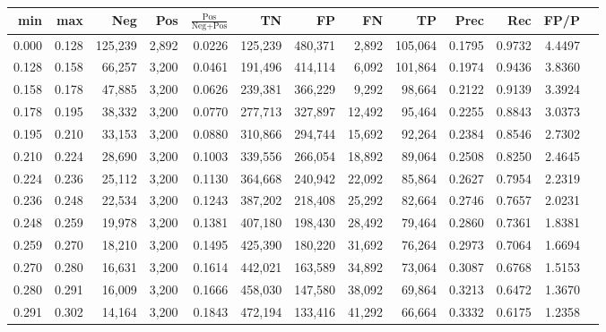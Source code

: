 \begin{tabular}{rrrrrrrrrrrrr}
\toprule
  min &   max &     Neg &   Pos & $\frac{\text{Pos}}{\text{Neg}+\text{Pos}}$ &      TN &      FP &      FN &      TP &   Prec &    Rec &   FP/P \\
\midrule
0.000 & 0.128 & 125,239 & 2,892 &                                     0.0226 & 125,239 & 480,371 &   2,892 & 105,064 & 0.1795 & 0.9732 & 4.4497 \\
0.128 & 0.158 &  66,257 & 3,200 &                                     0.0461 & 191,496 & 414,114 &   6,092 & 101,864 & 0.1974 & 0.9436 & 3.8360 \\
0.158 & 0.178 &  47,885 & 3,200 &                                     0.0626 & 239,381 & 366,229 &   9,292 &  98,664 & 0.2122 & 0.9139 & 3.3924 \\
0.178 & 0.195 &  38,332 & 3,200 &                                     0.0770 & 277,713 & 327,897 &  12,492 &  95,464 & 0.2255 & 0.8843 & 3.0373 \\
0.195 & 0.210 &  33,153 & 3,200 &                                     0.0880 & 310,866 & 294,744 &  15,692 &  92,264 & 0.2384 & 0.8546 & 2.7302 \\
0.210 & 0.224 &  28,690 & 3,200 &                                     0.1003 & 339,556 & 266,054 &  18,892 &  89,064 & 0.2508 & 0.8250 & 2.4645 \\
0.224 & 0.236 &  25,112 & 3,200 &                                     0.1130 & 364,668 & 240,942 &  22,092 &  85,864 & 0.2627 & 0.7954 & 2.2319 \\
0.236 & 0.248 &  22,534 & 3,200 &                                     0.1243 & 387,202 & 218,408 &  25,292 &  82,664 & 0.2746 & 0.7657 & 2.0231 \\
0.248 & 0.259 &  19,978 & 3,200 &                                     0.1381 & 407,180 & 198,430 &  28,492 &  79,464 & 0.2860 & 0.7361 & 1.8381 \\
0.259 & 0.270 &  18,210 & 3,200 &                                     0.1495 & 425,390 & 180,220 &  31,692 &  76,264 & 0.2973 & 0.7064 & 1.6694 \\
0.270 & 0.280 &  16,631 & 3,200 &                                     0.1614 & 442,021 & 163,589 &  34,892 &  73,064 & 0.3087 & 0.6768 & 1.5153 \\
0.280 & 0.291 &  16,009 & 3,200 &                                     0.1666 & 458,030 & 147,580 &  38,092 &  69,864 & 0.3213 & 0.6472 & 1.3670 \\
0.291 & 0.302 &  14,164 & 3,200 &                                     0.1843 & 472,194 & 133,416 &  41,292 &  66,664 & 0.3332 & 0.6175 & 1.2358 \\

\end{tabular}
